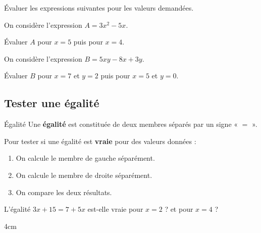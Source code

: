 \documentclass[a4paper]{book}
\begin{document}
    
    \begin{exemple}
        Évaluer les expressions suivantes pour les valeurs demandées.

        \smallskip

        \begin{minipage}{0.49\linewidth}
            On considère l'expression $A=3x^2-5x$.

            \smallskip

            Évaluer $A$ pour $x=5$ puis pour $x=4$.

            \vspace{4.5cm}
        \end{minipage}
        \hfill\vline\hfill
        \begin{minipage}{0.49\linewidth}
            On considère l'expression $B=5xy-8x+3y$.

            \smallskip

            Évaluer $B$ pour $x=7$ et $y=2$ puis pour $x=5$ et $y=0$.

            \vspace{4.5cm}
        \end{minipage}
    \end{exemple}
    
    
\subsection{Tester une égalité}
    
    \begin{definitionTitre}{Égalité}
        Une \textbf{égalité} est constituée de deux membres séparés par un signe « $=$ ».
    \end{definitionTitre}
    
    
    \begin{methode}
        Pour tester si une égalité est \textbf{vraie} pour des valeurs données :
        \begin{enumerate}
            \item On calcule le membre de gauche séparément.
            \item On calcule le membre de droite séparément.
            \item On compare les deux résultats.
        \end{enumerate}
    \end{methode}
    
    
    \begin{exemple}
        L'égalité $3x + 15 = 7 + 5x$ est-elle vraie pour $x = 2$ ? et pour $x = 4$ ?
        \begin{ZoneReponse}{4cm}
            
        \end{ZoneReponse}
    \end{exemple}
\end{document}
